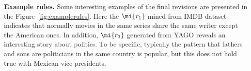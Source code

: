 \textbf{Example rules.} Some interesting examples of the final revisions are presented in the Figure~\ref{fig:examplerules}. Here 
the $\mi{r_1}$ mined from IMDB dataset indicates that normally movies in the same series share the same writer except the American ones. In addition, $\mi{r_3}$ generated from YAGO reveals an interesting story about politics. To be specific, typically  the pattern that fathers and sons are politicians in the same country is popular, but this does not hold true with Mexican vice-presidents.